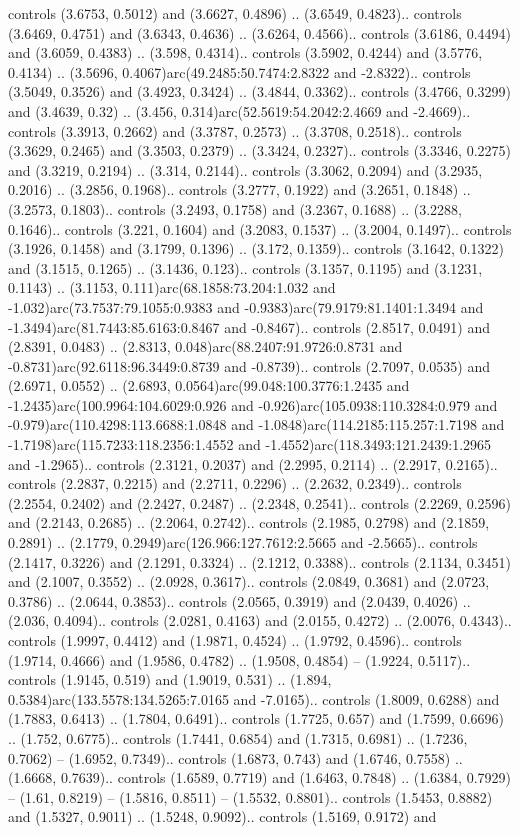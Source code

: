 controls (3.6753, 0.5012) and (3.6627, 0.4896) .. (3.6549, 0.4823).. controls (3.6469, 0.4751) and (3.6343, 0.4636) .. (3.6264, 0.4566).. controls (3.6186, 0.4494) and (3.6059, 0.4383) .. (3.598, 0.4314).. controls (3.5902, 0.4244) and (3.5776, 0.4134) .. (3.5696, 0.4067)arc(49.2485:50.7474:2.8322 and -2.8322).. controls (3.5049, 0.3526) and (3.4923, 0.3424) .. (3.4844, 0.3362).. controls (3.4766, 0.3299) and (3.4639, 0.32) .. (3.456, 0.314)arc(52.5619:54.2042:2.4669 and -2.4669).. controls (3.3913, 0.2662) and (3.3787, 0.2573) .. (3.3708, 0.2518).. controls (3.3629, 0.2465) and (3.3503, 0.2379) .. (3.3424, 0.2327).. controls (3.3346, 0.2275) and (3.3219, 0.2194) .. (3.314, 0.2144).. controls (3.3062, 0.2094) and (3.2935, 0.2016) .. (3.2856, 0.1968).. controls (3.2777, 0.1922) and (3.2651, 0.1848) .. (3.2573, 0.1803).. controls (3.2493, 0.1758) and (3.2367, 0.1688) .. (3.2288, 0.1646).. controls (3.221, 0.1604) and (3.2083, 0.1537) .. (3.2004, 0.1497).. controls (3.1926, 0.1458) and (3.1799, 0.1396) .. (3.172, 0.1359).. controls (3.1642, 0.1322) and (3.1515, 0.1265) .. (3.1436, 0.123).. controls (3.1357, 0.1195) and (3.1231, 0.1143) .. (3.1153, 0.111)arc(68.1858:73.204:1.032 and -1.032)arc(73.7537:79.1055:0.9383 and -0.9383)arc(79.9179:81.1401:1.3494 and -1.3494)arc(81.7443:85.6163:0.8467 and -0.8467).. controls (2.8517, 0.0491) and (2.8391, 0.0483) .. (2.8313, 0.048)arc(88.2407:91.9726:0.8731 and -0.8731)arc(92.6118:96.3449:0.8739 and -0.8739).. controls (2.7097, 0.0535) and (2.6971, 0.0552) .. (2.6893, 0.0564)arc(99.048:100.3776:1.2435 and -1.2435)arc(100.9964:104.6029:0.926 and -0.926)arc(105.0938:110.3284:0.979 and -0.979)arc(110.4298:113.6688:1.0848 and -1.0848)arc(114.2185:115.257:1.7198 and -1.7198)arc(115.7233:118.2356:1.4552 and -1.4552)arc(118.3493:121.2439:1.2965 and -1.2965).. controls (2.3121, 0.2037) and (2.2995, 0.2114) .. (2.2917, 0.2165).. controls (2.2837, 0.2215) and (2.2711, 0.2296) .. (2.2632, 0.2349).. controls (2.2554, 0.2402) and (2.2427, 0.2487) .. (2.2348, 0.2541).. controls (2.2269, 0.2596) and (2.2143, 0.2685) .. (2.2064, 0.2742).. controls (2.1985, 0.2798) and (2.1859, 0.2891) .. (2.1779, 0.2949)arc(126.966:127.7612:2.5665 and -2.5665).. controls (2.1417, 0.3226) and (2.1291, 0.3324) .. (2.1212, 0.3388).. controls (2.1134, 0.3451) and (2.1007, 0.3552) .. (2.0928, 0.3617).. controls (2.0849, 0.3681) and (2.0723, 0.3786) .. (2.0644, 0.3853).. controls (2.0565, 0.3919) and (2.0439, 0.4026) .. (2.036, 0.4094).. controls (2.0281, 0.4163) and (2.0155, 0.4272) .. (2.0076, 0.4343).. controls (1.9997, 0.4412) and (1.9871, 0.4524) .. (1.9792, 0.4596).. controls (1.9714, 0.4666) and (1.9586, 0.4782) .. (1.9508, 0.4854) -- (1.9224, 0.5117).. controls (1.9145, 0.519) and (1.9019, 0.531) .. (1.894, 0.5384)arc(133.5578:134.5265:7.0165 and -7.0165).. controls (1.8009, 0.6288) and (1.7883, 0.6413) .. (1.7804, 0.6491).. controls (1.7725, 0.657) and (1.7599, 0.6696) .. (1.752, 0.6775).. controls (1.7441, 0.6854) and (1.7315, 0.6981) .. (1.7236, 0.7062) -- (1.6952, 0.7349).. controls (1.6873, 0.743) and (1.6746, 0.7558) .. (1.6668, 0.7639).. controls (1.6589, 0.7719) and (1.6463, 0.7848) .. (1.6384, 0.7929) -- (1.61, 0.8219) -- (1.5816, 0.8511) -- (1.5532, 0.8801).. controls (1.5453, 0.8882) and (1.5327, 0.9011) .. (1.5248, 0.9092).. controls (1.5169, 0.9172) and 